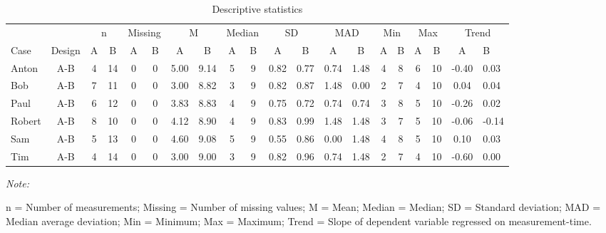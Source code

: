 \documentclass[
]{book}
\begin{document}
\begin{table}[!h]

\caption{\label{tab:unnamed-chunk-85}Descriptive statistics}
\begin{threeparttable}
\begin{tabular}[t]{lccccccccccccccccccl}
\toprule
\multicolumn{2}{c}{ } & \multicolumn{2}{c}{n} & \multicolumn{2}{c}{Missing} & \multicolumn{2}{c}{M} & \multicolumn{2}{c}{Median} & \multicolumn{2}{c}{SD} & \multicolumn{2}{c}{MAD} & \multicolumn{2}{c}{Min} & \multicolumn{2}{c}{Max} & \multicolumn{2}{c}{Trend} \\
\cmidrule(l{3pt}r{3pt}){3-4} \cmidrule(l{3pt}r{3pt}){5-6} \cmidrule(l{3pt}r{3pt}){7-8} \cmidrule(l{3pt}r{3pt}){9-10} \cmidrule(l{3pt}r{3pt}){11-12} \cmidrule(l{3pt}r{3pt}){13-14} \cmidrule(l{3pt}r{3pt}){15-16} \cmidrule(l{3pt}r{3pt}){17-18} \cmidrule(l{3pt}r{3pt}){19-20}
Case & Design & A & B & A & B & A & B & A & B & A & B & A & B & A & B & A & B & A & B\\
\midrule
Anton & A-B & 4 & 14 & 0 & 0 & 5.00 & 9.14 & 5 & 9 & 0.82 & 0.77 & 0.74 & 1.48 & 4 & 8 & 6 & 10 & -0.40 & 0.03\\
Bob & A-B & 7 & 11 & 0 & 0 & 3.00 & 8.82 & 3 & 9 & 0.82 & 0.87 & 1.48 & 0.00 & 2 & 7 & 4 & 10 & 0.04 & 0.04\\
Paul & A-B & 6 & 12 & 0 & 0 & 3.83 & 8.83 & 4 & 9 & 0.75 & 0.72 & 0.74 & 0.74 & 3 & 8 & 5 & 10 & -0.26 & 0.02\\
Robert & A-B & 8 & 10 & 0 & 0 & 4.12 & 8.90 & 4 & 9 & 0.83 & 0.99 & 1.48 & 1.48 & 3 & 7 & 5 & 10 & -0.06 & -0.14\\
Sam & A-B & 5 & 13 & 0 & 0 & 4.60 & 9.08 & 5 & 9 & 0.55 & 0.86 & 0.00 & 1.48 & 4 & 8 & 5 & 10 & 0.10 & 0.03\\
Tim & A-B & 4 & 14 & 0 & 0 & 3.00 & 9.00 & 3 & 9 & 0.82 & 0.96 & 0.74 & 1.48 & 2 & 7 & 4 & 10 & -0.60 & 0.00\\
\bottomrule
\end{tabular}
\begin{tablenotes}
\item \textit{Note: } 
\item n = Number of measurements; Missing = Number of missing values; M = Mean; Median = Median; SD = Standard deviation; MAD = Median average deviation; Min = Minimum; Max = Maximum; Trend = Slope of dependent variable regressed on measurement-time.
\end{tablenotes}
\end{threeparttable}
\end{table}
\end{document}
